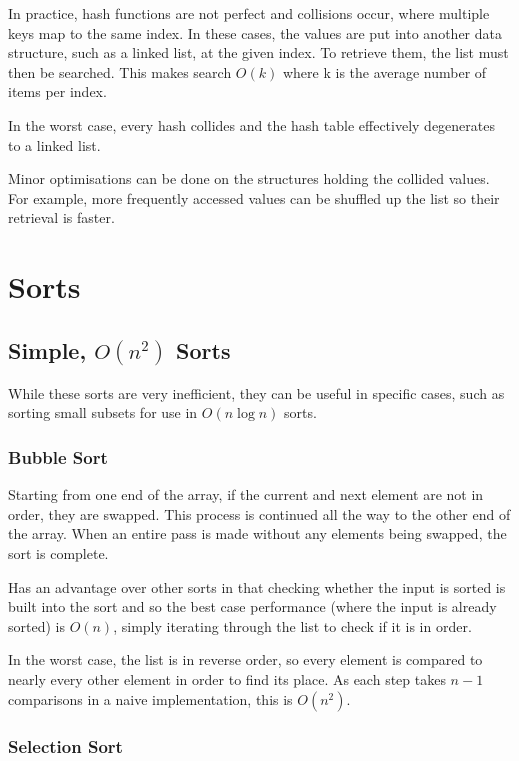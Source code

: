\documentclass[]{article}
\begin{document}
In practice, hash functions are not perfect and collisions occur, where multiple keys map to the same index. In these cases, the values are put into another data structure, such as a linked list, at the given index. To retrieve them, the list must then be searched. This makes search $O(k)$ where k is the average number of items per index.

In the worst case, every hash collides and the hash table effectively degenerates to a linked list.

Minor optimisations can be done on the structures holding the collided values. For example, more frequently accessed values can be shuffled up the list so their retrieval is faster.

\pagebreak

\section{Sorts}

\subsection{Simple, $O(n^2)$ Sorts}

While these sorts are very inefficient, they can be useful in specific cases, such as sorting small subsets for use in $O(n\log{n})$ sorts.

\subsubsection{Bubble Sort}

Starting from one end of the array, if the current and next element are not in order, they are swapped. This process is continued all the way to the other end of the array. When an entire pass is made without any elements being swapped, the sort is complete.

Has an advantage over other sorts in that checking whether the input is sorted is built into the sort and so the best case performance (where the input is already sorted) is $O(n)$, simply iterating through the list to check if it is in order.

In the worst case, the list is in reverse order, so every element is compared to nearly every other element in order to find its place. As each step takes $n - 1$ comparisons in a naive implementation, this is $O(n^2)$.

\subsubsection{Selection Sort}
\end{document}
